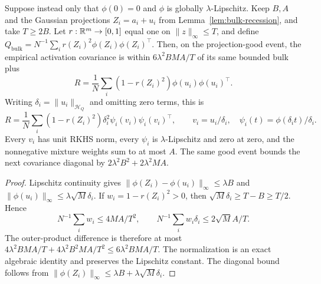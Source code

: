 \begin{lemma}
\label{lem:bulk-lipschitz-auxiliary}
Suppose instead only that $\phi(0)=0$ and $\phi$ is globally
$\lambda$-Lipschitz. Keep $B,A$ and the Gaussian projections $Z_i=a_i+u_i$
from Lemma~\ref{lem:bulk-recession}, and take $T\geq2B$.
Let $r:\mathbb R^m\to[0,1]$ equal one on $\|z\|_\infty\le T$, and define
$Q_{\mathrm{bulk}}=N^{-1}\sum_i r(Z_i)^2\phi(Z_i)\phi(Z_i)^\top$.
Then, on the projection-good event, the empirical activation covariance is within
$6\lambda^2 BMA/T$ of its same bounded bulk plus
\[
 R=\frac1N\sum_i(1-r(Z_i)^2)\phi(u_i)\phi(u_i)^\top.
\]
Writing $\delta_i=\|u_i\|_{\mathcal H_Q}$ and omitting zero terms, this is
\[
 R=\frac1N\sum_i(1-r(Z_i)^2)\delta_i^2
       \psi_i(v_i)\psi_i(v_i)^\top,\qquad
 v_i=u_i/\delta_i,\quad \psi_i(t)=\phi(\delta_i t)/\delta_i.
\]
Every $v_i$ has unit RKHS norm, every $\psi_i$ is $\lambda$-Lipschitz
and zero at zero, and the nonnegative mixture weights sum to at most $A$.
The same good event bounds the next covariance diagonal by
$2\lambda^2 B^2+2\lambda^2 MA$.
\end{lemma}
\begin{proof}
Lipschitz continuity gives
$\|\phi(Z_i)-\phi(u_i)\|_\infty\leq\lambda B$ and
$\|\phi(u_i)\|_\infty\leq\lambda\sqrt M\delta_i$.
If $w_i=1-r(Z_i)^2>0$, then
$\sqrt M\delta_i\ge T-B\ge T/2$. Hence
\[
 N^{-1}\sum_iw_i\le4MA/T^2,\qquad
 N^{-1}\sum_iw_i\delta_i\le2\sqrt M A/T.
\]
The outer-product difference is therefore at most
$4\lambda^2 BMA/T+4\lambda^2 B^2MA/T^2\leq6\lambda^2 BMA/T$.
The normalization is an exact algebraic identity and preserves the
Lipschitz constant. The diagonal bound follows from
$\|\phi(Z_i)\|_\infty\leq\lambda B+\lambda\sqrt M\delta_i$.
\end{proof}

